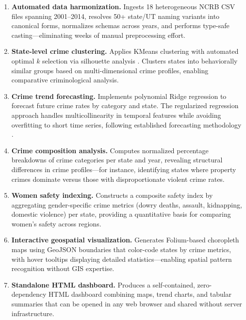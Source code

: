 \documentclass[a4paper,12pt]{article}
\begin{document}
\begin{enumerate}[leftmargin=*, itemsep=2pt]
    \item \textbf{Automated data harmonization.} Ingests 18 heterogeneous NCRB CSV files spanning 2001--2014, resolves 50+ state/UT naming variants into canonical forms, normalizes schemas across years, and performs type-safe casting---eliminating weeks of manual preprocessing effort.
    
    \item \textbf{State-level crime clustering.} Applies KMeans clustering \cite{hartigan1979} with automated optimal $k$ selection via silhouette analysis \cite{rousseeuw1987}. Clusters states into behaviorally similar groups based on multi-dimensional crime profiles, enabling comparative criminological analysis.
    
    \item \textbf{Crime trend forecasting.} Implements polynomial Ridge regression \cite{hoerl1970} to forecast future crime rates by category and state. The regularized regression approach handles multicollinearity in temporal features while avoiding overfitting to short time series, following established forecasting methodology \cite{hyndman2021}.
    
    \item \textbf{Crime composition analysis.} Computes normalized percentage breakdowns of crime categories per state and year, revealing structural differences in crime profiles---for instance, identifying states where property crimes dominate versus those with disproportionate violent crime rates.
    
    \item \textbf{Women safety indexing.} Constructs a composite safety index by aggregating gender-specific crime metrics (dowry deaths, assault, kidnapping, domestic violence) per state, providing a quantitative basis for comparing women's safety across regions.
    
    \item \textbf{Interactive geospatial visualization.} Generates Folium-based choropleth maps using GeoJSON boundaries that color-code states by crime metrics, with hover tooltips displaying detailed statistics---enabling spatial pattern recognition without GIS expertise.
    
    \item \textbf{Standalone HTML dashboard.} Produces a self-contained, zero-dependency HTML dashboard combining maps, trend charts, and tabular summaries that can be opened in any web browser and shared without server infrastructure.
\end{enumerate}
\end{document}
